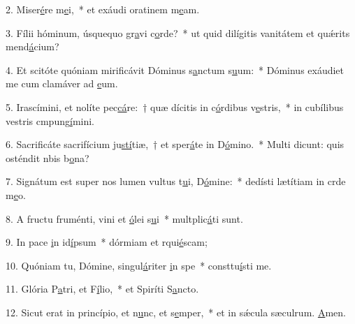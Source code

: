2. Miser\uline{é}re m\uline{e}i,~* et exáudi oratinem m\uline{e}am.\par 
3. Fílii hóminum, úsquequo gr\uline{a}vi c\uline{o}rde?~* ut quid dilígitis vanitátem et quǽrits mend\uline{á}cium?\par 
4. Et scitóte quóniam mirificávit Dóminus s\uline{a}nctum s\uline{u}um:~* Dóminus exáudiet me cum clamáver ad \uline{e}um.\par 
5. Irascímini, et nolíte pec\uline{cá}re:~† quæ dícitis in c\uline{ó}rdibus v\uline{e}stris,~* in cubílibus vestris cmpung\uline{í}mini.\par 
6. Sacrificáte sacrifícium ju\uline{stí}tiæ,~† et sper\uline{á}te in D\uline{ó}mino.~* Multi dicunt: quis osténdit nbis b\uline{o}na?\par 
7. Signátum est super nos lumen vultus t\uline{u}i, D\uline{ó}mine:~* dedísti lætítiam in crde m\uline{e}o.\par 
8. A fructu fruménti, vini et \uline{ó}lei s\uline{u}i~* multplic\uline{á}ti sunt.\par 
9. In pace \uline{i}n id\uline{í}psum~* dórmiam et rqui\uline{é}scam;\par 
10. Quóniam tu, Dómine, singul\uline{á}riter \uline{i}n spe~* consttu\uline{í}sti me.\par 
11. Glória P\uline{a}tri, et F\uline{í}lio,~* et Spiríti S\uline{a}ncto.\par 
12. Sicut erat in princípio, et n\uline{u}nc, et s\uline{e}mper,~* et in sǽcula sæculrum. \uline{A}men.\par 
